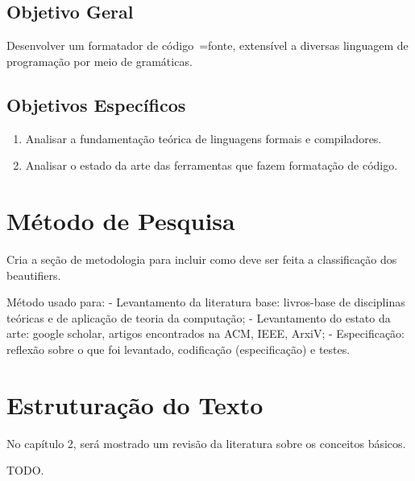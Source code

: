 \subsection{Objetivo Geral}

Desenvolver um formatador de código~=fonte,
extensível a diversas linguagem de programação por meio de gramáticas.


\subsection{Objetivos Específicos}

\begin{enumerate}
    \item Analisar a fundamentação teórica de linguagens formais e
    compiladores.
    \item Analisar o estado da arte das ferramentas que fazem formatação de código.
\end{enumerate}


\section{Método de Pesquisa}

Cria a seção de metodologia para incluir como deve ser feita a classificação dos beautifiers.

Método usado para:
- Levantamento da literatura base: livros-base de disciplinas teóricas e de aplicação de teoria da computação;
- Levantamento do estato da arte: google scholar, artigos encontrados na ACM, IEEE, ArxiV;
- Especificação: reflexão sobre o que foi levantado, codificação (especificação) e testes.


\section{Estruturação do Texto}

No capítulo 2,
será mostrado um revisão da literatura sobre os conceitos básicos.

TODO.

